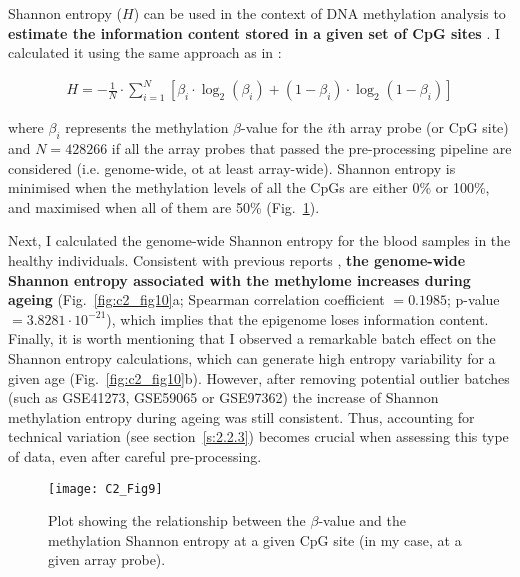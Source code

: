 \smallskip

Shannon entropy ($H$) can be used in the context of DNA methylation analysis to \textbf{estimate the information content stored in a given set of CpG sites} \citep{Wang2017,Slieker2016,Hannum2013,Xie2011,Jenkinson2017}. I calculated it using the same approach as in \citet{Hannum2013}:

\begin{align}
H = - \frac{1}{N} \cdot \sum_{i=1}^{N}[\beta_i \cdot \log_2(\beta_i) + (1-\beta_i) \cdot \log_2(1-\beta_i)]
\end{align}

where $\beta_i$ represents the methylation $\beta$-value for the $i$th array probe (or CpG site) and $N=428266$ if all the array probes that passed the pre-processing pipeline are considered (i.e. genome-wide, ot at least array-wide). Shannon entropy is minimised when the methylation levels of all the CpGs are either 0\% or 100\%, and maximised when all of them are 50\% (Fig.~\ref{fig:c2_fig9}).

\bigskip

Next, I calculated the genome-wide  Shannon entropy for the blood samples in the healthy individuals. Consistent with previous reports \citep{Slieker2016,Hannum2013,Wang2017,Jenkinson2017},  \textbf{the genome-wide Shannon entropy associated with the methylome increases during ageing} (Fig.~\ref{fig:c2_fig10}a; Spearman correlation coefficient $= 0.1985$; p-value $= 3.8281 \cdot 10^{-21}$), which implies that the epigenome loses information content. Finally, it is worth mentioning that I observed a remarkable batch effect on the Shannon entropy calculations, which can generate high entropy variability for a given age (Fig.~\ref{fig:c2_fig10}b). However, after removing potential outlier batches (such as GSE41273, GSE59065 or GSE97362) the increase of Shannon methylation entropy during ageing was still consistent. Thus, accounting for technical variation (see section~\ref{s:2.2.3}) becomes crucial when assessing this type of data, even after careful pre-processing. 

\begin{figure}[htbp!] 
	\centering
	\vspace*{3mm}    
	\texttt{[image: C2\_Fig9]}
	\caption[Relationship between the $\beta$-value and the Shannon entropy at a given CpG site]{Plot showing the relationship between the $\beta$-value and the methylation Shannon entropy at a given CpG site (in my case, at a given array probe).}
	\label{fig:c2_fig9}
\end{figure}

